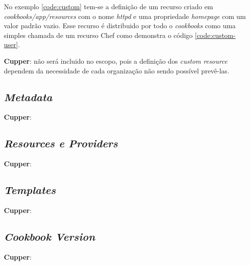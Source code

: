 No exemplo \ref{code:custom} tem-se a definição de um recurso criado em \textit{cookbooks/app/resources}
com o nome \textit{httpd} e uma propriedade \textit{homepage} com um valor padrão vazio.
Esse recurso é distribuido por todo o \textit{cookbooks} como uma simples chamada
de um recurso Chef como demonstra o código \ref{code:custom-user}.

\noindent\begin{minipage}{.45\textwidth}
  \lstset{style=shell}
  
\end{minipage}\hfill
\begin{minipage}{.45\textwidth}
  \lstset{style=shell}
  
\end{minipage}

\textbf{Cupper}: não será incluido no escopo, pois a definição dos \textit{custom resource} dependem
da necessidade de cada organização não sendo possível prevê-las.

\subsection{\textit{Metadata}}

\textbf{Cupper}:

\subsection{\textit{Resources e Providers}}

\textbf{Cupper}:

\subsection{\textit{Templates}}

\textbf{Cupper}:

\subsection{\textit{Cookbook Version}}

\textbf{Cupper}:

